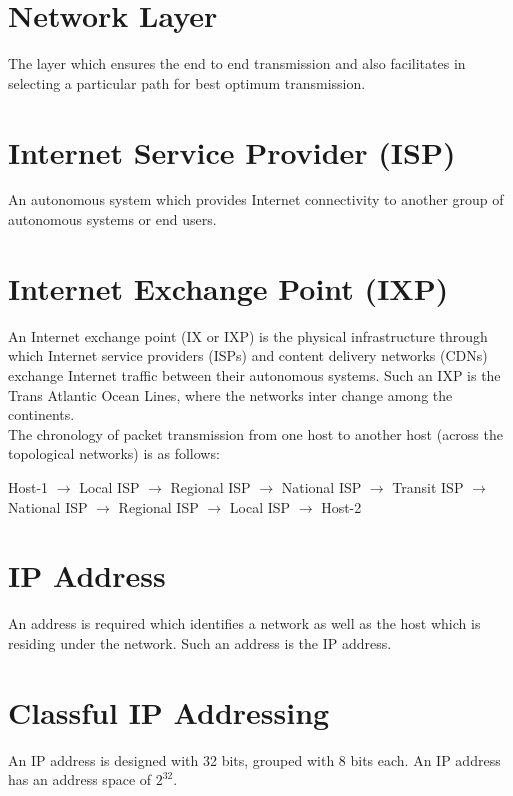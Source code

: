 \documentclass[12pt]{article}
\begin{document}
\maketitle

\section{Network Layer}
    The layer which ensures the end to end transmission and also facilitates in selecting a particular path for best optimum transmission.

\section{Internet Service Provider (ISP)}
    An autonomous system which provides Internet connectivity to another group of autonomous systems or end users.

\section{Internet Exchange Point (IXP)}
    An Internet exchange point (IX or IXP) is the physical infrastructure through which Internet service providers (ISPs) and content delivery networks (CDNs) exchange Internet traffic between their autonomous systems. Such an IXP is the Trans Atlantic Ocean Lines, where the networks inter change among the continents. \\
    
    The chronology of packet transmission from one host to another host (across the topological networks) is as follows:
    
    Host-1 $\rightarrow$ Local ISP $\rightarrow$ Regional ISP $\rightarrow$ National ISP $\rightarrow$ Transit ISP $\rightarrow$ National ISP $\rightarrow$ Regional ISP $\rightarrow$ Local ISP $\rightarrow$ Host-2
    
\section{IP Address}
    An address is required which identifies a network as well as the host which is residing under the network. Such an address is the IP address.        
\section{Classful IP Addressing}

An IP address is designed with 32 bits, grouped with 8 bits each. An IP address has an address space of $2^{32}$.
\end{document}
